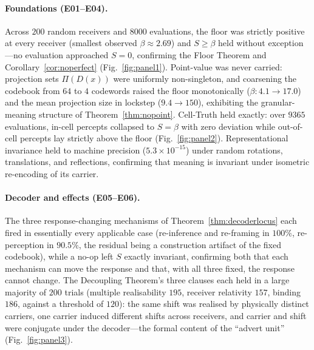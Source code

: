 \documentclass[twocolumn,11pt,a4paper]{article}
\theoremstyle{adv}
\theoremstyle{definition}
\theoremstyle{remark}
\newcommand{\Dec}{D}                   %
\newcommand{\Proj}{\Pi}                %
\newcommand{\Sval}{S}                  %
\newcommand{\floor}{\beta}            %
\begin{document}
\paragraph{Foundations (E01--E04).}
Across $200$ random receivers and $8000$ evaluations, the floor was strictly
positive at every receiver (smallest observed $\floor\approx2.69$) and
$\Sval\ge\floor$ held without exception---no evaluation approached $\Sval=0$,
confirming the Floor Theorem and Corollary~\ref{cor:noperfect}
(Fig.~\ref{fig:panel1}). Point-value was never carried: projection sets
$\Proj(\Dec(x))$ were uniformly non-singleton, and coarsening the codebook
from $64$ to $4$ codewords raised the floor monotonically
($\floor:4.1\!\to\!17.0$) and the mean projection size in lockstep
($9.4\!\to\!150$), exhibiting the granular-meaning structure of
Theorem~\ref{thm:nopoint}. Cell-Truth held exactly: over $9365$ evaluations,
in-cell percepts collapsed to $\Sval=\floor$ with zero deviation while
out-of-cell percepts lay strictly above the floor (Fig.~\ref{fig:panel2}).
Representational invariance held to machine precision
($5.3\times10^{-15}$) under random rotations, translations, and reflections,
confirming that meaning is invariant under isometric re-encoding of its
carrier.

\paragraph{Decoder and effects (E05--E06).}
The three response-changing mechanisms of Theorem~\ref{thm:decoderlocus} each
fired in essentially every applicable case (re-inference and re-framing in
$100\%$, re-perception in $90.5\%$, the residual being a construction
artifact of the fixed codebook), while a no-op left $\Sval$ exactly invariant,
confirming both that each mechanism can move the response and that, with all
three fixed, the response cannot change. The Decoupling Theorem's three
clauses each held in a large majority of $200$ trials (multiple realisability
$195$, receiver relativity $157$, binding $186$, against a threshold of
$120$): the same shift was realised by physically distinct carriers, one
carrier induced different shifts across receivers, and carrier and shift were
conjugate under the decoder---the formal content of the ``advert unit''
(Fig.~\ref{fig:panel3}).
\end{document}
